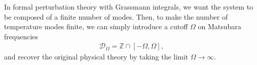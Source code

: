 \begin{appendices}
In formal perturbation theory with Grassmann integrals, we want the system to be composed of
a finite number of modes. Then, to make the number of temperature modes finite, we can simply
introduce a cutoff $\Omega$ on Matsubara frequencies
\begin{align*}
	\mathcal{D}_\Omega = \mathbb{Z} \cap [-\Omega,\Omega],
\end{align*}
and recover the original physical theory by taking the limit $\Omega\to\infty$.

\end{appendices}
